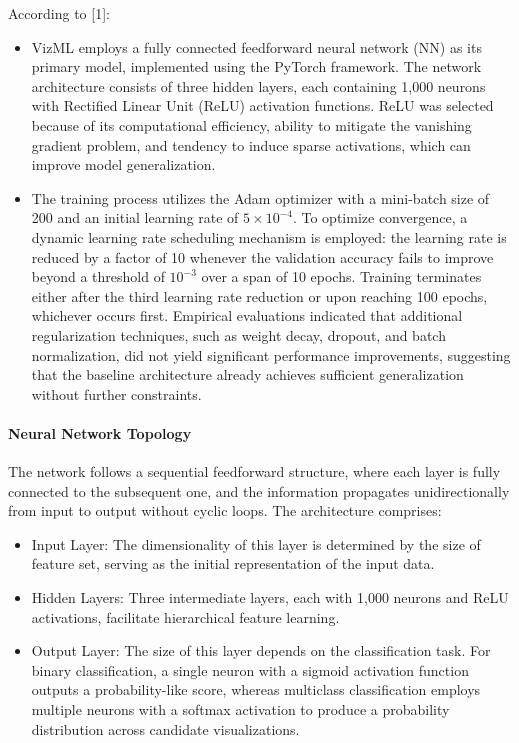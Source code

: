 According to [1]:
\begin{itemize}
\item VizML employs a fully connected feedforward neural network (NN) as its primary model, implemented using the PyTorch framework. The network architecture consists of three hidden layers, each containing 1,000 neurons with Rectified Linear Unit (ReLU) activation functions. ReLU was selected because of its computational efficiency, ability to mitigate the vanishing gradient problem, and tendency to induce sparse activations, which can improve model generalization.

\item The training process utilizes the Adam optimizer with a mini-batch size of 200 and an initial learning rate of $5 \times 10^{-4}$. To optimize convergence, a dynamic learning rate scheduling mechanism is employed: the learning rate is reduced by a factor of 10 whenever the validation accuracy fails to improve beyond a threshold of $10^{-3}$ over a span of 10 epochs. Training terminates either after the third learning rate reduction or upon reaching 100 epochs, whichever occurs first. Empirical evaluations indicated that additional regularization techniques, such as weight decay, dropout, and batch normalization, did not yield significant performance improvements, suggesting that the baseline architecture already achieves sufficient generalization without further constraints.
\end{itemize}

\paragraph{Neural Network Topology}
The network follows a sequential feedforward structure, where each layer is fully connected to the subsequent one, and the information propagates unidirectionally from input to output without cyclic loops. The architecture comprises:

\begin{itemize}
    \item Input Layer: The dimensionality of this layer is determined by the size of feature set, serving as the initial representation of the input data.
    \item Hidden Layers: Three intermediate layers, each with 1,000 neurons and ReLU activations, facilitate hierarchical feature learning.
    \item Output Layer: The size of this layer depends on the classification task. For binary classification, a single neuron with a sigmoid activation function outputs a probability-like score, whereas multiclass classification employs multiple neurons with a softmax activation to produce a probability distribution across candidate visualizations.
\end{itemize}

